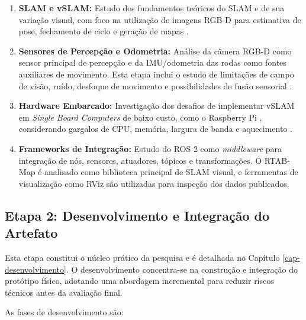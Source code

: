 \begin{enumerate}
     \item \textbf{SLAM e vSLAM:} Estudo dos fundamentos teóricos do SLAM e de sua variação visual, com foco na utilização de imagens RGB-D para estimativa de pose, fechamento de ciclo e geração de mapas \cite{taheri2021slamdefinitionevolution, guapacha2017localizacaomapeamentosimultaneos}.

    \item \textbf{Sensores de Percepção e Odometria:} Análise da câmera RGB-D como sensor principal de percepção e da IMU/odometria das rodas como fontes auxiliares de movimento. Esta etapa inclui o estudo de limitações de campo de visão, ruído, desfoque de movimento e possibilidades de fusão sensorial \cite{kamarudin2015improvingperformance2d, qayyum2017imuaidedrgbd}.

    \item \textbf{Hardware Embarcado:} Investigação dos desafios de implementar vSLAM em \textit{Single Board Computers} de baixo custo, como o Raspberry Pi \cite{raspberrypi2019raspberrypi}, considerando gargalos de CPU, memória, largura de banda e aquecimento \cite{costa2019characterizingpolybenchgpu, canovas2021onboarddynamicrgbd}.
    
    \item \textbf{Frameworks de Integração:} Estudo do ROS 2 como \emph{middleware} para integração de nós, sensores, atuadores, tópicos e transformações. O RTAB-Map é analisado como biblioteca principal de SLAM visual, e ferramentas de visualização como RViz são utilizadas para inspeção dos dados publicados.
\end{enumerate}

\subsection{Etapa 2: Desenvolvimento e Integração do Artefato}
\label{ssec:etapa2_artefato}

Esta etapa constitui o núcleo prático da pesquisa e é detalhada no Capítulo \ref{cap-desenvolvimento}. O desenvolvimento concentra-se na construção e integração do protótipo físico, adotando uma abordagem incremental para reduzir riscos técnicos antes da avaliação final.

As fases de desenvolvimento são:

